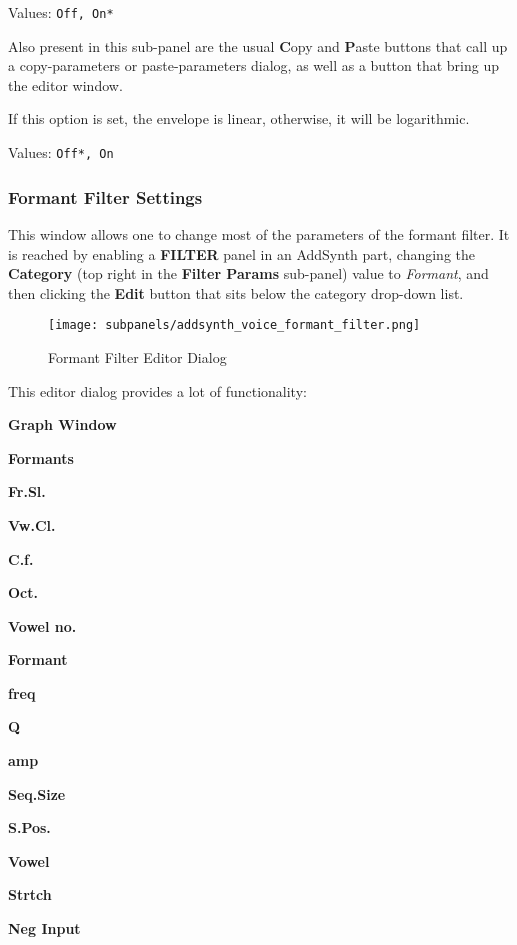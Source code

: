    Values: \texttt{Off, On*}

   Also present in this sub-panel are the usual \textbf{C}opy
   and \textbf{P}aste buttons that call up a copy-parameters or
   paste-parameters dialog, as well as a button that bring up the editor
   window.


   If this option is set, the envelope is linear, otherwise, it will be
   logarithmic.

   Values: \texttt{Off*, On}

\subsubsection{Formant Filter Settings}
\label{subsubsec:formant_filter_settings}

   This window allows one to change most of the parameters of the formant
   filter.   It is reached by enabling a \textbf{FILTER} panel in an AddSynth
   part,
   changing the \textbf{Category} (top right in the \textbf{Filter Params}
   sub-panel) value to \textsl{Formant}, and then clicking
   the \textbf{Edit} button that sits below the category drop-down list.

\begin{figure}[H]
   \centering
   \texttt{[image: subpanels/addsynth\_voice\_formant\_filter.png]}
   \caption[Formant Filter Editor]{Formant Filter Editor Dialog}
   \label{fig:formant_filter_editor}
\end{figure}

   This editor dialog provides a lot of functionality:

   \begin{enumber}
      \item \textbf{Graph Window}
      \item \textbf{Formants}
      \item \textbf{Fr.Sl.}
      \item \textbf{Vw.Cl.}
      \item \textbf{C.f.}
      \item \textbf{Oct.}
      \item \textbf{Vowel no.}
      \item \textbf{Formant}
      \item \textbf{freq}
      \item \textbf{Q}
      \item \textbf{amp}
      \item \textbf{Seq.Size}
      \item \textbf{S.Pos.}
      \item \textbf{Vowel}
      \item \textbf{Strtch}
      \item \textbf{Neg Input}
   \end{enumber}


